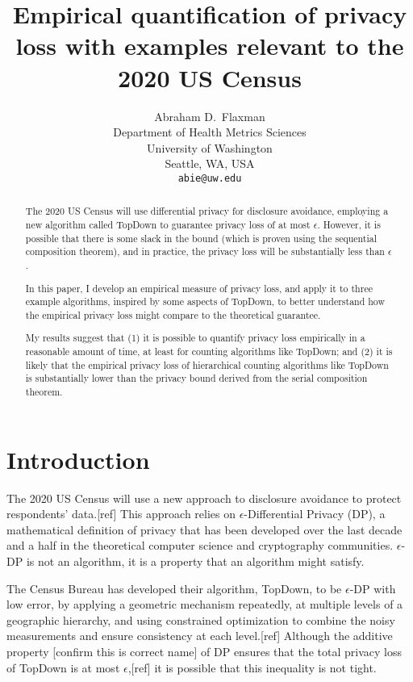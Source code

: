 \documentclass{article}
\title{Empirical quantification of privacy loss with examples relevant to the 2020 US Census}
\author{%
  Abraham D.~Flaxman \\
  Department of Health Metrics Sciences\\
  University of Washington\\
  Seattle, WA, USA \\
  \texttt{abie@uw.edu} \\
}
\begin{document}
\maketitle

\begin{abstract}
  The 2020 US Census will use differential privacy for disclosure avoidance, employing a new algorithm called TopDown to guarantee privacy loss of at most $\epsilon$.  However, it is possible that there is some slack in the bound (which is proven using the sequential composition theorem), and in practice, the privacy loss will be substantially less than $\epsilon$.
  
  In this paper, I develop an empirical measure of privacy loss, and apply it to three  example algorithms, inspired by some aspects of TopDown, to better understand how the empirical privacy loss might compare to the theoretical guarantee.
  
  My results suggest that (1) it is possible to quantify privacy loss empirically in a reasonable amount of time, at least for counting algorithms like TopDown; and (2) it is likely that the empirical privacy loss of hierarchical counting algorithms like TopDown is substantially lower than the privacy bound derived from the serial composition theorem.
\end{abstract}

\section{Introduction}

The 2020 US Census will use a new approach to disclosure avoidance to protect respondents’ data.[ref] This approach relies on $\epsilon$-Differential Privacy (DP), a mathematical definition of privacy that has been developed over the last decade and a half in the theoretical computer science and cryptography communities. $\epsilon$-DP is not an algorithm, it is a property that an algorithm might satisfy.

The Census Bureau has developed their algorithm, TopDown, to be $\epsilon$-DP with low error, by applying a geometric mechanism repeatedly, at multiple levels of a geographic hierarchy, and using constrained optimization to combine the noisy measurements and ensure consistency at each level.[ref]  Although the additive property [confirm this is correct name] of DP ensures that the total privacy loss of TopDown is at most $\epsilon$,[ref] it is possible that this inequality is not tight.\cite{hasselmo}
\end{document}
